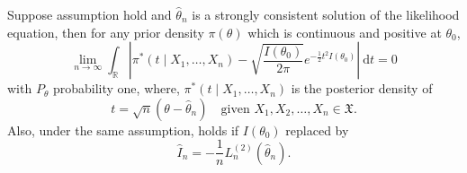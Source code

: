 \begin{theorem}
    Suppose assumption hold and $\widehat{\theta}_n$ is a strongly consistent solution of the likelihood 
    equation, then for any prior density $\pi(\theta)$ which is continuous and positive at $\theta_0$, 
    \begin{equation}
        \lim_{n \to \infty} \int_{\mathbb{R}} \left| \pi^*(t \mid X_1, \ldots, X_n) 
        - \sqrt{\frac{I(\theta_0)}{2\pi}} e^{-\frac{1}{2} t^2 I(\theta_0)} \right| \> \mathrm{d}t = 0
    \end{equation}
    with $P_\theta$ probability one, where, $\pi^*(t \mid X_1, \ldots, X_n) $ is the posterior density of 
    \[
        t = \sqrt{n} (\theta - \widehat{\theta}_n) \quad \text{given } X_1, X_2, \ldots, X_n \in \mathfrak{X}.
    \]
    Also, under the same assumption, holds if $I(\theta_0)$ replaced by 
    \[
        \widehat{I}_n = -\frac{1}{n}L^{(2)}_n(\widehat{\theta}_n).
    \]
\end{theorem}
